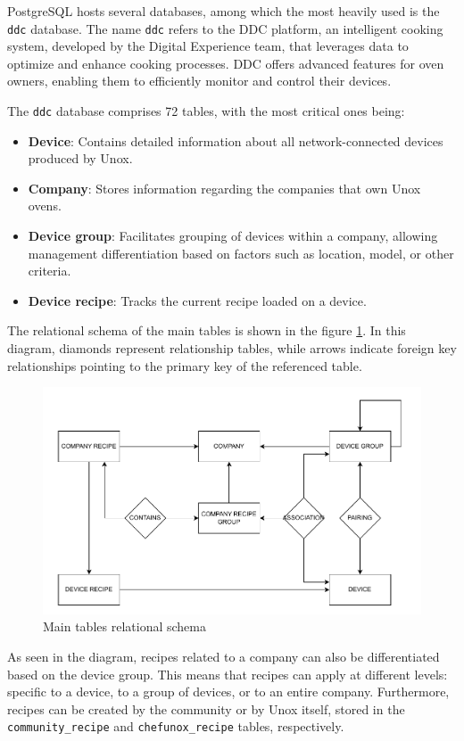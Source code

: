 PostgreSQL hosts several databases, among which the most heavily used is the \texttt{ddc} database. The name \texttt{ddc} refers to the \acf{DDC} platform, an intelligent cooking system, developed by the Digital Experience team, that leverages data to optimize and enhance cooking processes. \ac{DDC} offers advanced features for oven owners, enabling them to efficiently monitor and control their devices.

The \texttt{ddc} database comprises 72 tables, with the most critical ones being:
\begin{itemize}
    \item \textbf{Device}: Contains detailed information about all network-connected devices produced by Unox.
    \item \textbf{Company}: Stores information regarding the companies that own Unox ovens.
    \item \textbf{Device group}: Facilitates grouping of devices within a company, allowing management differentiation based on factors such as location, model, or other criteria.
    \item \textbf{Device recipe}: Tracks the current recipe loaded on a device.
\end{itemize}
The relational schema of the main tables is shown in the figure \ref{fig:relschema}. In this diagram, diamonds represent relationship tables, while arrows indicate foreign key relationships pointing to the primary key of the referenced table.
\begin{figure}[H]
    \centering
    \includegraphics[width=1\textwidth]{res/db-schema.pdf}
    \caption{Main tables relational schema}
    \label{fig:relschema}
\end{figure}
As seen in the diagram, recipes related to a company can also be differentiated based on the device group. This means that recipes can apply at different levels: specific to a device, to a group of devices, or to an entire company. Furthermore, recipes can be created by the community or by Unox itself, stored in the \texttt{community\_recipe} and \texttt{chefunox\_recipe} tables, respectively.

